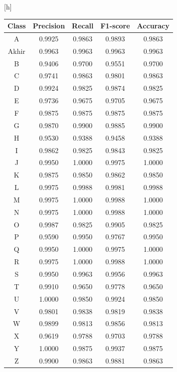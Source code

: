 \begin{center}[h]
	\begin{table}[htbp]
	\centering
	\label{tbl:Tabel Confusion Matrix Xception}
	\begin{tabular}{|c|c|c|c|c|}
	\hline
	Class & Precision & Recall & F1-score & Accuracy \\
	\hline
	A & 0.9925 & 0.9863 & 0.9893 & 0.9863 \\
	Akhir & 0.9963 & 0.9963 & 0.9963 & 0.9963 \\
	B & 0.9406 & 0.9700 & 0.9551 & 0.9700 \\
	C & 0.9741 & 0.9863 & 0.9801 & 0.9863 \\
	D & 0.9924 & 0.9825 & 0.9874 & 0.9825 \\
	E & 0.9736 & 0.9675 & 0.9705 & 0.9675 \\
	F & 0.9875 & 0.9875 & 0.9875 & 0.9875 \\
	G & 0.9870 & 0.9900 & 0.9885 & 0.9900 \\
	H & 0.9530 & 0.9388 & 0.9458 & 0.9388 \\
	I & 0.9862 & 0.9825 & 0.9843 & 0.9825 \\
	J & 0.9950 & 1.0000 & 0.9975 & 1.0000 \\
	K & 0.9875 & 0.9850 & 0.9862 & 0.9850 \\
	L & 0.9975 & 0.9988 & 0.9981 & 0.9988 \\
	M & 0.9975 & 1.0000 & 0.9988 & 1.0000 \\
	N & 0.9975 & 1.0000 & 0.9988 & 1.0000 \\
	O & 0.9987 & 0.9825 & 0.9905 & 0.9825 \\
	P & 0.9590 & 0.9950 & 0.9767 & 0.9950 \\
	Q & 0.9950 & 1.0000 & 0.9975 & 1.0000 \\
	R & 0.9975 & 1.0000 & 0.9988 & 1.0000 \\
	S & 0.9950 & 0.9963 & 0.9956 & 0.9963 \\
	T & 0.9910 & 0.9650 & 0.9778 & 0.9650 \\
	U & 1.0000 & 0.9850 & 0.9924 & 0.9850 \\
	V & 0.9801 & 0.9838 & 0.9819 & 0.9838 \\
	W & 0.9899 & 0.9813 & 0.9856 & 0.9813 \\
	X & 0.9619 & 0.9788 & 0.9703 & 0.9788 \\
	Y & 1.0000 & 0.9875 & 0.9937 & 0.9875 \\
	Z & 0.9900 & 0.9863 & 0.9881 & 0.9863 \\
	\hline
	\end{tabular}
	\end{table}
\end{center}

